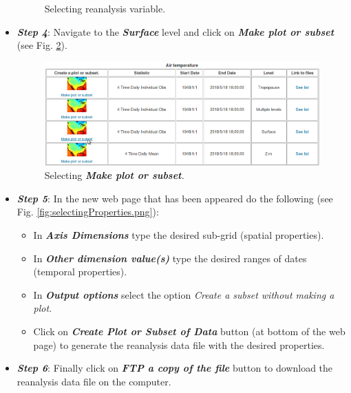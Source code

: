 \begin{onehalfspace}
\begin{itemize}
\begin{figure}[ht!]
							\caption{Selecting reanalysis variable.}
							\label{fig:selectingVariable}
						\end{figure}
					\item \textit{\textbf{Step 4}}: Navigate to the \textit{\textbf{Surface}} level and click on \textit{\textbf{Make plot or subset}} (see Fig. \ref{fig:selectingMakePlot}).
						\begin{figure}[ht!]
							\centering
							\includegraphics[scale=0.42]{figures/selectingMakePlot.png}
							\caption{Selecting \textit{\textbf{Make plot or subset}.}}
							\label{fig:selectingMakePlot}
						\end{figure}
					\item \textit{\textbf{Step 5}}: In the new web page that has been appeared do the following (see Fig. \ref{fig:selectingProperties.png}):
						\begin{itemize}
							\item In \textit{\textbf{Axis Dimensions}} type the desired sub-grid (spatial properties).
							\item In \textit{\textbf{Other dimension value(s)}} type the desired ranges of dates (temporal properties).
							\item In \textit{\textbf{Output options}} select the option \textit{Create a subset without making a plot}.
							\item Click on \textit{\textbf{Create Plot or Subset of Data}} button (at bottom of the web page) to generate the reanalysis data file with the desired properties.
						\end{itemize}
					\item \textit{\textbf{Step 6}}: Finally click on \textit{\textbf{FTP a copy of the file}} button to download the reanalysis data file on the computer.
				\end{itemize}
				

\end{onehalfspace}

